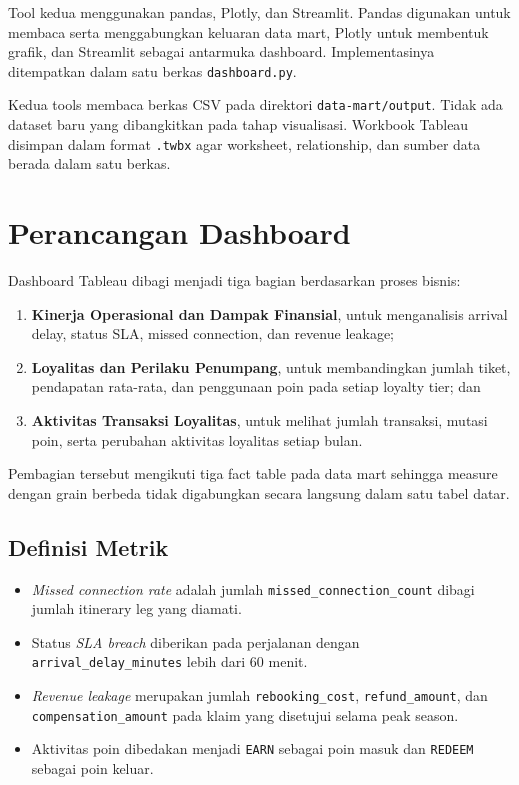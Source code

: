 Tool kedua menggunakan pandas, Plotly, dan Streamlit. Pandas digunakan untuk
membaca serta menggabungkan keluaran data mart, Plotly untuk membentuk grafik,
dan Streamlit sebagai antarmuka dashboard. Implementasinya ditempatkan dalam satu
berkas \texttt{dashboard.py}.

Kedua tools membaca berkas CSV pada direktori \texttt{data-mart/output}. Tidak ada
dataset baru yang dibangkitkan pada tahap visualisasi. Workbook Tableau disimpan
dalam format \texttt{.twbx} agar worksheet, relationship, dan sumber data berada
dalam satu berkas.

\section{Perancangan Dashboard}

Dashboard Tableau dibagi menjadi tiga bagian berdasarkan proses bisnis:

\begin{enumerate}[label=\alph*., leftmargin=*]
    \item \textbf{Kinerja Operasional dan Dampak Finansial}, untuk menganalisis
    arrival delay, status SLA, missed connection, dan revenue leakage;
    \item \textbf{Loyalitas dan Perilaku Penumpang}, untuk membandingkan jumlah
    tiket, pendapatan rata-rata, dan penggunaan poin pada setiap loyalty tier; dan
    \item \textbf{Aktivitas Transaksi Loyalitas}, untuk melihat jumlah transaksi,
    mutasi poin, serta perubahan aktivitas loyalitas setiap bulan.
\end{enumerate}

Pembagian tersebut mengikuti tiga fact table pada data mart sehingga measure
dengan grain berbeda tidak digabungkan secara langsung dalam satu tabel datar.

\subsection{Definisi Metrik}

\begin{itemize}
    \item \textit{Missed connection rate} adalah jumlah
    \texttt{missed\_connection\_count} dibagi jumlah itinerary leg yang diamati.
    \item Status \textit{SLA breach} diberikan pada perjalanan dengan
    \texttt{arrival\_delay\_minutes} lebih dari 60 menit.
    \item \textit{Revenue leakage} merupakan jumlah \texttt{rebooking\_cost},
    \texttt{refund\_amount}, dan \texttt{compensation\_amount} pada klaim yang
    disetujui selama peak season.
    \item Aktivitas poin dibedakan menjadi \texttt{EARN} sebagai poin masuk dan
    \texttt{REDEEM} sebagai poin keluar.
\end{itemize}

